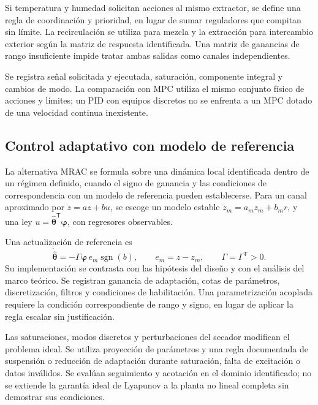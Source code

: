 Si temperatura y humedad solicitan acciones al mismo extractor, se define una regla de coordinación y prioridad, en lugar de sumar reguladores que compitan sin límite. La recirculación se utiliza para mezcla y la extracción para intercambio exterior según la matriz de respuesta identificada. Una matriz de ganancias de rango insuficiente impide tratar ambas salidas como canales independientes.

Se registra señal solicitada y ejecutada, saturación, componente integral y cambios de modo. La comparación con MPC utiliza el mismo conjunto físico de acciones y límites; un PID con equipos discretos no se enfrenta a un MPC dotado de una velocidad continua inexistente.

\subsection{Control adaptativo con modelo de referencia}
\label{met:mrac}

La alternativa MRAC se formula sobre una dinámica local identificada dentro de un régimen definido, cuando el signo de ganancia y las condiciones de correspondencia con un modelo de referencia pueden establecerse. Para un canal aproximado por $\dot z=az+bu$, se escoge un modelo estable $\dot z_m=a_mz_m+b_mr$, y una ley $u=\widehat{\boldsymbol\theta}^{\mathsf T}\boldsymbol\varphi$, con regresores observables.

Una actualización de referencia es
\begin{equation}
\dot{\widehat{\boldsymbol\theta}}
=-\Gamma\boldsymbol\varphi\,e_m
\operatorname{sgn}(b),
\qquad e_m=z-z_m,\qquad \Gamma=\Gamma^{\mathsf T}>0.
\label{met:mrac_actualizacion}
\end{equation}
Su implementación se contrasta con las hipótesis del diseño y con el análisis del marco teórico. Se registran ganancia de adaptación, cotas de parámetros, discretización, filtros y condiciones de habilitación. Una parametrización acoplada requiere la condición correspondiente de rango y signo, en lugar de aplicar la regla escalar sin justificación.

Las saturaciones, modos discretos y perturbaciones del secador modifican el problema ideal. Se utiliza proyección de parámetros y una regla documentada de suspensión o reducción de adaptación durante saturación, falta de excitación o datos inválidos. Se evalúan seguimiento y acotación en el dominio identificado; no se extiende la garantía ideal de Lyapunov a la planta no lineal completa sin demostrar sus condiciones.


